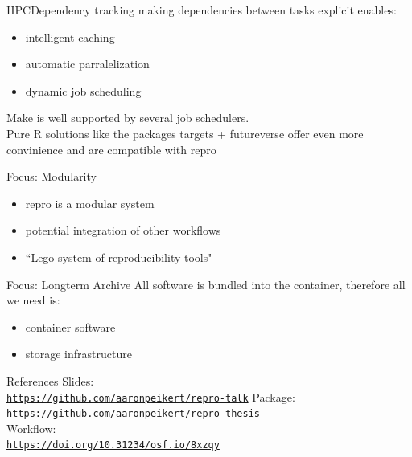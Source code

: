 \documentclass[12pt,t]{beamer}
\begin{document}
\begin{frame}[c]{HPC\textemdash{}Dependency tracking}
  making dependencies between tasks explicit enables:
  \begin{itemize}
  \item intelligent caching
  \item automatic parralelization
  \item dynamic job scheduling
  \end{itemize}
  \vspace{5mm}
  Make is well supported by several job schedulers.\\
  \vspace{5mm}
  Pure R solutions like the packages \textcolor{vhilit}{targets} + \textcolor{hilit}{futureverse} offer even more convinience and are compatible with repro
\end{frame}

\begin{frame}[c]{Focus: Modularity}
\begin{itemize}
	\item<1-> repro is a modular system
	\item<2-> potential integration of other workflows\\
	\item<3-> ``Lego system of reproducibility tools"
\end{itemize}
\end{frame}

\begin{frame}[c]{Focus: Longterm Archive}
	\textcolor<2>{lolit}{All software is bundled into the container, therefore all we need is:}
	\begin{itemize}
		\item \textcolor<2>{lolit}{container software}
		\item \textcolor<2>{lolit}{storage infrastructure}
	\end{itemize}


\end{frame}


\begin{frame}[c]{References}
	\textcolor{lolit}{Slides:\\}\href{https://github.com/aaronpeikert/repro-talk}{\texttt{\textcolor{foreground}{https://github.com/aaronpeikert/repro-talk}}}
	\textcolor{lolit}{Package:\\}\href{https://github.com/aaronpeikert/repro-thesis}{\texttt{\textcolor{foreground}{https://github.com/aaronpeikert/repro-thesis}}}\\
	\textcolor{lolit}{Workflow:\\}\href{https://doi.org/10.31234/osf.io/8xzqy}{\texttt{\textcolor{foreground}{https://doi.org/10.31234/osf.io/8xzqy}}}
\end{frame}

\begin{frame}[c]
  \Huge
\end{frame}
\end{document}
